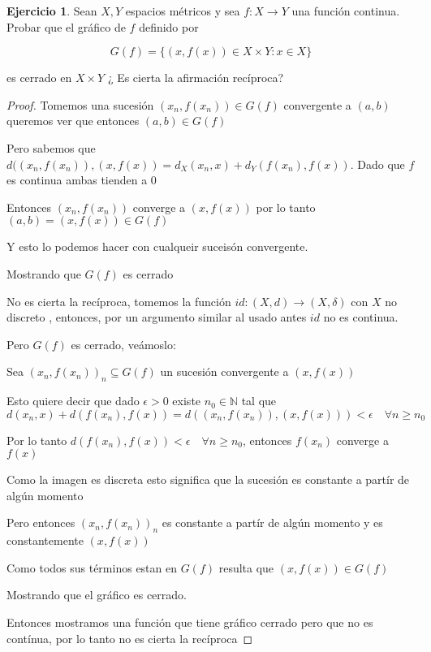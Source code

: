 \documentclass[11pt]{report}
\newcommand{\N}{\mathbb{N}}
\newcommand{\ra}{\rightarrow}
\theoremstyle{definition}
\newtheorem{ej}{Ejercicio}
\begin{document}
	\begin{ej}
		Sean $X, Y$ espacios métricos y sea $f: X \ra Y$ una función continua. Probar que el gráfico de $f$ definido por 

		$$ G(f) = \{(x,f(x)) \in X \times Y : x\in X\}$$

		es cerrado en $X \times Y$ ¿ Es cierta la afirmación recíproca?

		\begin{proof}
			Tomemos una sucesión $(x_n,f(x_n)) \in G(f)$ convergente a $(a,b)$ queremos ver que entonces $(a,b) \in G(f)$

			Pero sabemos que $d((x_n,f(x_n)),(x,f(x)) = d_X(x_n,x) + d_Y(f(x_n),f(x))$. Dado que $f$ es continua ambas tienden a 0

			Entonces $(x_n,f(x_n))$ converge a $(x,f(x))$ por lo tanto $(a,b) = (x,f(x)) \in G(f)$

			Y esto lo podemos hacer con cualqueir suceisón convergente.

			Mostrando que $G(f)$ es cerrado
			
			No es cierta la recíproca, tomemos la función $id : (X,d) \ra (X,\delta)$ con $X$ no discreto , entonces, por un argumento similar al usado antes $id$ no es continua.

			Pero $G(f)$ es cerrado, veámoslo:

			Sea $(x_n,f(x_n))_n \subseteq G(f)$ un sucesión convergente a $(x,f(x))$

			Esto quiere decir que dado $\epsilon > 0$ existe $n_0 \in \N$ tal que 
			$$d(x_n,x) + d(f(x_n),f(x)) =  d((x_n,f(x_n)),(x,f(x))) < \epsilon \quad \forall n \geq n_0$$

			Por lo tanto $d(f(x_n),f(x)) < \epsilon \quad \forall n \geq n_0$, entonces $f(x_n)$ converge a $f(x)$

			Como la imagen es discreta esto significa que la sucesión es constante a partír de algún momento

			Pero entonces $(x_n,f(x_n))_n$ es constante a partír de algún momento y es constantemente $(x,f(x))$

			Como todos sus términos estan en $G(f)$ resulta que $(x,f(x)) \in G(f)$

			Mostrando que el gráfico es cerrado.

			Entonces mostramos una función que tiene gráfico cerrado pero que no es contínua, por lo tanto no es cierta la recíproca


		\end{proof}
		
		
	\end{ej}
	
\end{document}
